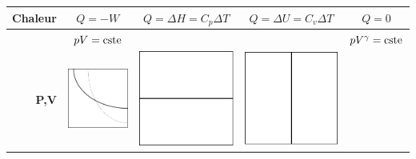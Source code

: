 \begin{table}[!h]
\begin{center}
\begin{tabular}{|r|c|c|c|c|}
 \hline

     \textbf{Chaleur}
     & $Q =  -W$
     & $Q = \Delta H = C_p \Delta T$
     & $Q = \Delta U = C_v \Delta T$
     & $Q= 0$\\

  \hline


  &$pV=\textup{cste} $
  &
  &
  &$pV^\gamma=\textup{cste}$
  \\

  \textbf{P,V}
     & \includegraphics[scale=0.25]{isothermepv.png}
     & \includegraphics[scale=0.25]{isobarepv.png}
     & \includegraphics[scale=0.25]{isochorepv.png}

\end{tabular}
\end{center}
\end{table}
